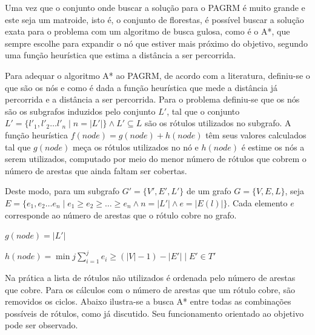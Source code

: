 \documentclass[12pt]{article}
\begin{document}
		Uma vez que o conjunto onde buscar a solução para o PAGRM é muito grande e este seja um matroide, isto é, o conjunto de florestas, é possível buscar a solução exata para o problema com um algoritmo de busca gulosa, como é o A*, que sempre escolhe para expandir o nó que estiver mais próximo do objetivo, segundo uma função heurística que estima a distância a ser percorrida.

		Para adequar o algoritmo A* ao PAGRM, de acordo com a literatura, definiu-se o que são os nós e como é dada a função heurística que mede a distância já percorrida e a distância a ser percorrida. Para o problema definiu-se que os nós são os subgrafos induzidos pelo conjunto $L'$, tal que o conjunto $L' = \{l'_1, l'_2 \dots l'_n \mid n = |L'|\} \wedge L' \subseteq L$ são os rótulos utilizados no subgrafo. A função heurística $f(node) = g(node) + h(node)$ têm seus valores calculados tal que $g(node)$ meça os rótulos utilizados no nó e $h(node)$ é estime os nós a serem utilizados, computado por meio do menor número de rótulos que cobrem o número de arestas que ainda faltam ser cobertas.

		Deste modo, para um subgrafo $G' = \{V', E', L'\}$ de um grafo $G = \{V, E, L\}$, seja $E = \{e_1, e_2 \dots e_n \mid e_1 \geq e_2 \geq \dots \geq e_n \wedge n = |L'| \wedge e = |E(l)|\}$. Cada elemento $e$ corresponde ao número de arestas que o rótulo cobre no grafo.

		$g(node) = |L'|$

		$h(node) = \displaystyle{\min j \sum_{i = 1}^{j}{e_i} \geq (|V| - 1) - |E'| \mid E' \in T'}$

		Na prática a lista de rótulos não utilizados é ordenada pelo número de arestas que cobre. Para os cálculos com o número de arestas que um rótulo cobre, são removidos os ciclos. Abaixo ilustra-se a busca A* entre todas as combinações possíveis de rótulos, como já discutido. Seu funcionamento orientado ao objetivo pode ser observado.
\end{document}

